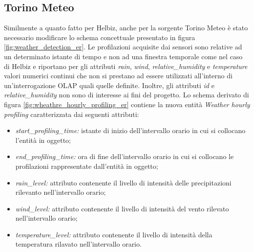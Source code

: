 \subsection{Torino Meteo}

Similmente a quanto fatto per Helbiz, anche per la sorgente Torino Meteo è
stato necessario modificare lo schema concettuale presentato in figura
\ref{fig:weather_detection_er}. Le profilazioni acquisite dai sensori
sono relative ad un determinato istante di tempo e non ad una finestra temporale
come nel caso di Helbiz e riportano per gli attributi \textit{rain},
\textit{wind}, \textit{relative\_humidity} e \textit{temperature} valori numerici
continui che non si prestano ad essere utilizzati all'interno di un'interrogazione
OLAP quali quelle definite. Inoltre, gli attributi \textit{id} e
\textit{relative\_humidity} non sono di interesse ai fini del progetto.
Lo schema derivato di figura \ref{fig:wheathre_hourly_profiling_er} contiene la
nuova entità \textit{Weather hourly profiling} caratterizzata dai seguenti attributi:
\begin{itemize}
\item \textit{start\_profiling\_time:} istante di inizio dell'intervallo orario in cui
si collocano l'entità in oggetto;
\item \textit{end\_profiling\_time:} ora di fine dell'intervallo orario in cui si
collocano le profilazioni rappresentate dall'entità in oggetto;
\item \textit{rain\_level:} attributo contenente il livello di intensità delle
precipitazioni rilevanto nell'intervallo orario;
\item \textit{wind\_level:} attributo contenente il livello di intensità del
vento rilevato nell'intervallo orario;
\item \textit{temperature\_level:} attributo contenente il livello di intensità della
temperatura rilavato nell'intervallo orario.
\end{itemize}

